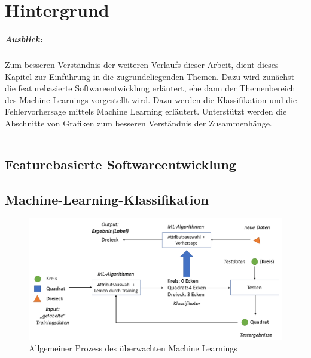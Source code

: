 
\chapter{Hintergrund}

\paragraph{Ausblick:}
Zum besseren Verständnis der weiteren Verlaufs dieser Arbeit, dient dieses Kapitel zur Einführung in die zugrundeliegenden Themen. Dazu wird zunächst die featurebasierte Softwareentwicklung erläutert, ehe dann der Themenbereich des Machine Learnings vorgestellt wird. Dazu werden die Klassifikation und die Fehlervorhersage mittels Machine Learning erläutert. Unterstützt werden die Abschnitte von Grafiken zum besseren Verständnis der Zusammenhänge.
\\
\hrule

\section{Featurebasierte Softwareentwicklung}

\section{Machine-Learning-Klassifikation}

\begin{figure}[H]
    \centering
    \includegraphics[width=\textwidth]{images/ML}
    \caption{Allgemeiner Prozess des überwachten Machine Learnings}\label{fig:ml}
\end{figure}

